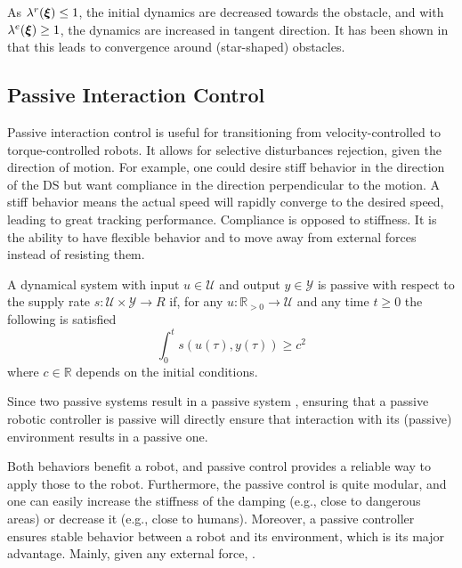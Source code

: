 \documentclass[conference]{IEEEtran}
\begin{document}
As $\lambda^r(\boldsymbol{\xi}) \leq 1$, the initial dynamics are decreased towards the obstacle, and with $\lambda^e(\boldsymbol{\xi}) \geq 1$, the dynamics are increased in tangent direction. It has been shown in \cite{huber2022avoiding} that this leads to convergence around (star-shaped) obstacles.

\subsection{Passive Interaction Control} \label{sec:trad_passive}
Passive interaction control \cite{kronander2015passive}is useful for transitioning from velocity-controlled to torque-controlled robots. It allows for selective disturbances rejection, given the direction of motion. For example, one could desire stiff behavior in the direction of the DS but want compliance in the direction perpendicular to the motion.
A stiff behavior means the actual speed will rapidly converge to the desired speed, leading to great tracking performance. Compliance is opposed to stiffness. It is the ability to have flexible behavior and to move away from external forces instead of resisting them.

\begin{definition}
  A dynamical system with input $ u \in \mathcal{U}$ and output $y \in \mathcal{Y}$ is passive with respect to the supply rate $s : \mathcal{U} \times \mathcal{Y} \rightarrow{R}$ if, for any $u: \mathbb{R}_{>0} \rightarrow \mathcal{U}$ and any time $t \geq 0$ the following is satisfied
  \begin{equation}
    \int_0^t s \left( u(\tau),  y (\tau) \right) \geq c^2
  \end{equation}
  where $c \in \mathbb{R}$ depends on the initial conditions.
\end{definition}

Since two passive systems result in a passive system \cite{sepulchre2012constructive}, ensuring that a passive robotic controller is passive will directly ensure that interaction with its (passive) environment results in a passive one.

Both behaviors benefit a robot, and passive control provides a reliable way to apply those to the robot.
Furthermore, the passive control is quite modular, and one can easily increase the stiffness of the damping (e.g., close to dangerous areas) or decrease it (e.g., close to humans). Moreover, a passive controller ensures stable behavior between a robot and its environment, which is its major advantage. Mainly, given any external force,
.
\end{document}
